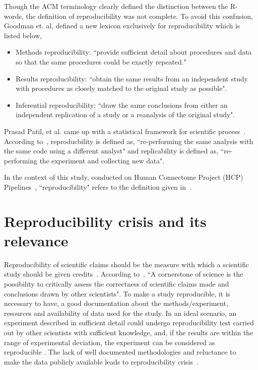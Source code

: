 Though the ACM terminology clearly defined the distinction between the R-words, the definition of reproducibility was not complete. To avoid this confusion, Goodman et. al, defined a new lexicon exclusively for reproducibility \cite{Goodman2016} which is listed below,

\begin{itemize}
\item {Methods reproducibility: ``provide sufficient detail about procedures and data so that the same procedures could be exactly repeated."}
\item {Results reproducibility: ``obtain the same results from an independent study with procedures as closely matched to the original study as possible".}
\item {Inferential reproducibility: ``draw the same conclusions from either an independent replication of a study or a reanalysis of the original study".}
\end{itemize}

Prasad Patil, et al. came up with a statistical framework for scientific process~\cite{Patil2016}. According to~\cite{Patil2016}, reproducbility is defined as, ``re-performing the same analysis with the same code using a different analyst" and replicability is defined as, ``re-performing the experiment and collecting new data".

In the context of this study, conducted on Human Connectome Project (HCP) Pipelines~\cite{Gla13}, ``reproducibility" refers to the definition given in~\cite{Patil2016}. 

\section{Reproducibility crisis and its relevance}
Reproducibility of scientific claims should be the measure with which a scientific study should be given credits~\cite{Estimating-reproducibility}. According to~\cite{Plesser2018}, ``A cornerstone of science is the possibility to critically assess the correctness of scientific claims made and conclusions drawn by other scientists".
To make a study reproducible, it is necessary to have, a good documentation about the methods/experiment, resources and availability of data used for the study. In an ideal scenario, an experiment described in sufficient detail could undergo reproducibility test carried out by other scientists with sufficient knowledge, and, if the results are within the range of experimental deviation, the experiment can be considered as reproducible \cite{Plesser2018}. The lack of well documented methodologies and reluctance to make the data publicly available leads to reproducibility crisis~\cite{Baker2016}.


